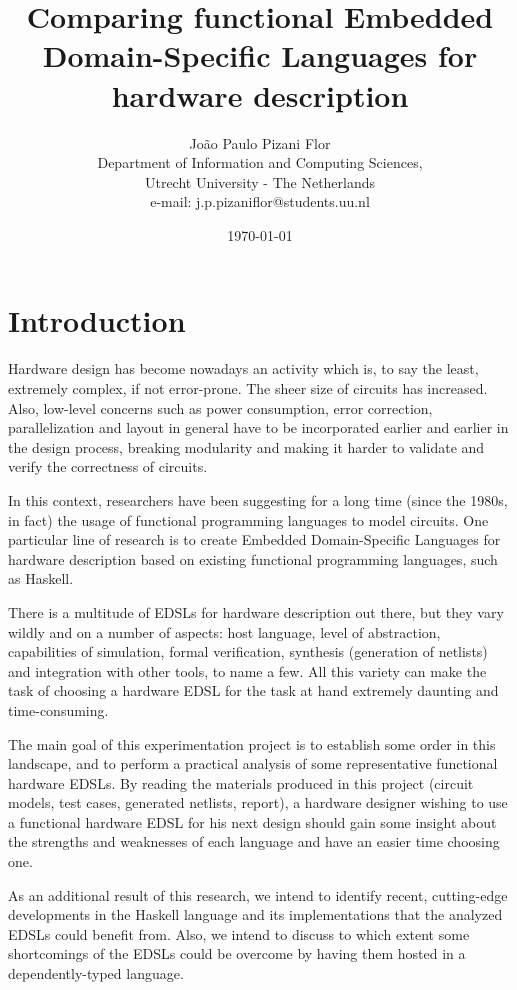 \documentclass[a4paper]{article}
\title{Comparing functional Embedded Domain-Specific Languages for hardware description}
\date{\today}
\author
{
    João Paulo Pizani Flor \\
    Department of Information and Computing Sciences, \\
    Utrecht University - The Netherlands \\
    e-mail: j.p.pizaniflor@students.uu.nl
}
\begin{document}
    \maketitle

    \section{Introduction}
    \label{sec:intro}
        Hardware design has become nowadays an activity which is, to say the least, extremely
        complex, if not error-prone. The sheer size of circuits has increased. Also, low-level
        concerns such as power consumption, error correction, parallelization and layout
        in general have to be incorporated earlier and earlier in the design process, breaking
        modularity and making it harder to validate and verify the correctness of circuits.

        In this context, researchers have been suggesting for a long time (since the 1980s, in
        fact) the usage of functional programming languages to model circuits. One particular line
        of research is to create Embedded Domain-Specific Languages for hardware description based
        on existing functional programming languages, such as Haskell.

        There is a multitude of EDSLs for hardware description out there, but they vary wildly and
        on a number of aspects: host language, level of abstraction, capabilities of simulation,
        formal verification, synthesis (generation of netlists) and integration with other tools, to
        name a few. All this variety can make the task of choosing a hardware EDSL for the task at
        hand extremely daunting and time-consuming.

        The main goal of this experimentation project is to establish some order in this landscape,
        and to perform a practical analysis of some representative functional hardware EDSLs. By
        reading the materials produced in this project (circuit models, test cases, generated
        netlists, report), a hardware designer wishing to use a functional hardware EDSL for his
        next design should gain some insight about the strengths and weaknesses of each language and
        have an easier time choosing one.

        As an additional result of this research, we intend to identify recent, cutting-edge
        developments in the Haskell language and its implementations that the analyzed EDSLs could
        benefit from. Also, we intend to discuss to which extent some shortcomings of the EDSLs
        could be overcome by having them hosted in a dependently-typed language.
\end{document}
